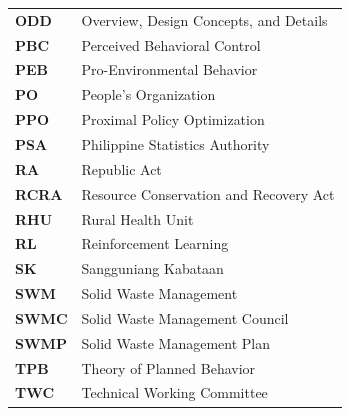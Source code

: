 \begin{longtable}{p{} p{}}
    \textbf{ODD} & Overview, Design Concepts, and Details \\
    \textbf{PBC} & Perceived Behavioral Control \\
    \textbf{PEB} & Pro-Environmental Behavior \\
    \textbf{PO} & People's Organization \\
    \textbf{PPO} & Proximal Policy Optimization \\
    \textbf{PSA} & Philippine Statistics Authority \\
    \textbf{RA} & Republic Act \\
    \textbf{RCRA} & Resource Conservation and Recovery Act \\
    \textbf{RHU} & Rural Health Unit \\
    \textbf{RL} & Reinforcement Learning \\
    \textbf{SK} & Sangguniang Kabataan \\
    \textbf{SWM} & Solid Waste Management \\
    \textbf{SWMC} & Solid Waste Management Council \\
    \textbf{SWMP} & Solid Waste Management Plan \\
    \textbf{TPB} & Theory of Planned Behavior \\
    \textbf{TWC} & Technical Working Committee \\
\end{longtable}